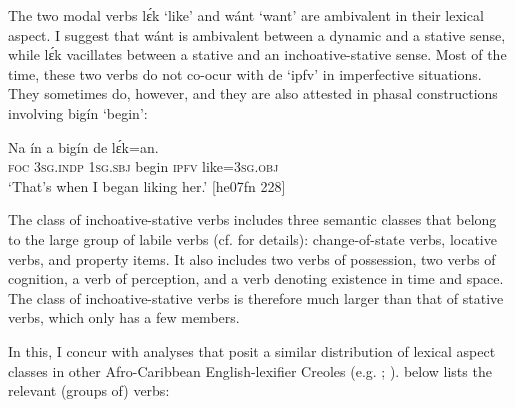 \z

The two modal verbs lɛ́k ‘like’ and wánt ‘want’ are ambivalent in their lexical aspect. I suggest that wánt is ambivalent between a dynamic and a stative sense, while lɛ́k vacillates between a stative and an inchoative-stative sense. Most of the time, these two verbs do not co-ocur with de ‘ipfv’ in imperfective situations. They sometimes do, however, and they are also attested in phasal constructions involving bigín ‘begin’: 


\ea%
    \label{ex:key:301}
    \gll Na  ín    a    bigín  de  lɛ́k=an.\\
\textsc{foc}  \textsc{3sg.indp}  \textsc{1sg.sbj}  begin  \textsc{ipfv}  like\textsc{=3sg.obj}\\

\glt ‘That’s when I began liking her.’ [he07fn 228]
\z

The class of inchoative-stative verbs includes three semantic classes that belong to the large group of labile verbs (cf.  for details): change-of-state verbs, locative verbs, and property items. It also includes two verbs of possession, two verbs of cognition, a verb of perception, and a verb denoting existence in time and space. The class of inchoative-stative verbs is therefore much larger than that of stative verbs, which only has a few members. 

In this, I concur with analyses that posit a similar distribution of lexical aspect classes in other Afro-Caribbean English-lexifier Creoles (e.g. \citealt{Winford1993}; \citealt{Migge2000}).  below lists the relevant (groups of) verbs:


